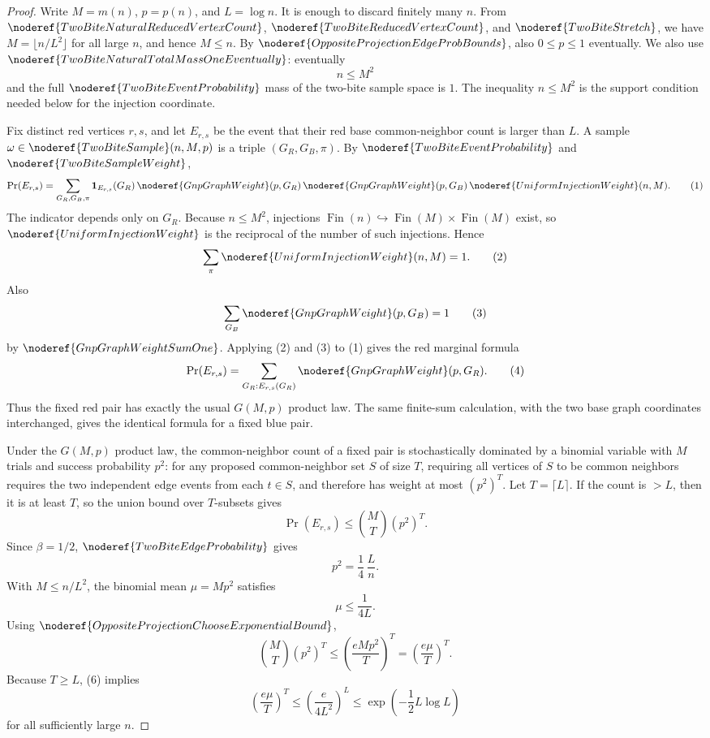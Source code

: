 \begin{proof}
Write \(M=m(n)\), \(p=p(n)\), and \(L=\log n\).  It is enough to discard
finitely many \(n\).  From \(\noderef{TwoBiteNaturalReducedVertexCount}\),
\(\noderef{TwoBiteReducedVertexCount}\), and \(\noderef{TwoBiteStretch}\), we
have \(M=\lfloor n/L^2\rfloor\) for all large \(n\), and hence \(M\le n\).
By \(\noderef{OppositeProjectionEdgeProbBounds}\), also \(0\le p\le1\)
eventually.  We also use \(\noderef{TwoBiteNaturalTotalMassOneEventually}\):
eventually
\[
n\le M^2
\]
and the full \(\noderef{TwoBiteEventProbability}\) mass of the two-bite
sample space is \(1\).  The inequality \(n\le M^2\) is the support condition
needed below for the injection coordinate.

Fix distinct red vertices \(r,s\), and let \(E_{r,s}\) be the event that their
red base common-neighbor count is larger than \(L\).  A sample
\(\omega\in\noderef{TwoBiteSample}(n,M,p)\) is a triple
\((G_R,G_B,\pi)\).  By \(\noderef{TwoBiteEventProbability}\) and
\(\noderef{TwoBiteSampleWeight}\),
\[
\Pr(E_{r,s})
=
\sum_{G_R,G_B,\pi}
\mathbf 1_{E_{r,s}}(G_R)\,
\noderef{GnpGraphWeight}(p,G_R)\,
\noderef{GnpGraphWeight}(p,G_B)\,
\noderef{UniformInjectionWeight}(n,M).
\tag{1}
\]
The indicator depends only on \(G_R\).  Because \(n\le M^2\), injections
\(\operatorname{Fin}(n)\hookrightarrow\operatorname{Fin}(M)\times
\operatorname{Fin}(M)\) exist, so \(\noderef{UniformInjectionWeight}\) is the
reciprocal of the number of such injections.  Hence
\[
\sum_\pi \noderef{UniformInjectionWeight}(n,M)=1.
\tag{2}
\]
Also
\[
\sum_{G_B}\noderef{GnpGraphWeight}(p,G_B)=1
\tag{3}
\]
by \(\noderef{GnpGraphWeightSumOne}\).  Applying (2) and (3) to (1) gives the
red marginal formula
\[
\Pr(E_{r,s})
=
\sum_{G_R:E_{r,s}(G_R)}
\noderef{GnpGraphWeight}(p,G_R).
\tag{4}
\]
Thus the fixed red pair has exactly the usual \(G(M,p)\) product law.  The
same finite-sum calculation, with the two base graph coordinates interchanged,
gives the identical formula for a fixed blue pair.

Under the \(G(M,p)\) product law, the common-neighbor count of a fixed pair is
stochastically dominated by a binomial variable with \(M\) trials and success
probability \(p^2\): for any proposed common-neighbor set \(S\) of size \(T\),
requiring all vertices of \(S\) to be common neighbors requires the two
independent edge events from each \(t\in S\), and therefore has weight at most
\((p^2)^T\).  Let \(T=\lceil L\rceil\).  If the count is \(>L\), then it is at
least \(T\), so the union bound over \(T\)-subsets gives
\[
\Pr(E_{r,s})
\le \binom MT(p^2)^T.
\tag{5}
\]
Since \(\beta=1/2\), \(\noderef{TwoBiteEdgeProbability}\) gives
\[
p^2=\frac14\,\frac{L}{n}.
\]
With \(M\le n/L^2\), the binomial mean \(\mu=Mp^2\) satisfies
\[
\mu\le \frac{1}{4L}.
\tag{6}
\]
Using \(\noderef{OppositeProjectionChooseExponentialBound}\),
\[
\binom MT(p^2)^T
\le \left(\frac{eMp^2}{T}\right)^T
= \left(\frac{e\mu}{T}\right)^T.
\tag{7}
\]
Because \(T\ge L\), (6) implies
\[
\left(\frac{e\mu}{T}\right)^T
\le
\left(\frac{e}{4L^2}\right)^L
\le \exp\!\left(-\frac12 L\log L\right)
\tag{8}
\]
for all sufficiently large \(n\).


\end{proof}
